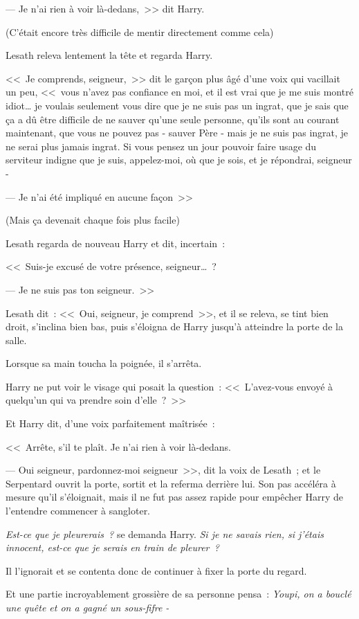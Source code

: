 --- Je n'ai rien à voir là-dedans,~>> dit Harry.

(C'était encore très difficile de mentir directement comme cela)

Lesath releva lentement la tête et regarda Harry.

<<~Je comprends, seigneur,~>> dit le garçon plus âgé d'une voix qui vacillait un peu, <<~vous n'avez pas confiance en moi, et il est vrai que je me suis montré idiot… je voulais seulement vous dire que je ne suis pas un ingrat, que je sais que ça a dû être difficile de ne sauver qu'une seule personne, qu'ils sont au courant maintenant, que vous ne pouvez pas - sauver Père - mais je ne suis pas ingrat, je ne serai plus jamais ingrat. Si vous pensez un jour pouvoir faire usage du serviteur indigne que je suis, appelez-moi, où que je sois, et je répondrai, seigneur -

--- Je n'ai été impliqué en aucune façon~>>

(Mais ça devenait chaque fois plus facile)

Lesath regarda de nouveau Harry et dit, incertain~:

<<~Suis-je excusé de votre présence, seigneur…~?

--- Je ne suis pas ton seigneur.~>>

Lesath dit~: <<~Oui, seigneur, je comprend~>>, et il se releva, se tint bien droit, s'inclina bien bas, puis s'éloigna de Harry jusqu'à atteindre la porte de la salle.

Lorsque sa main toucha la poignée, il s'arrêta.

Harry ne put voir le visage qui posait la question~: <<~L'avez-vous envoyé à quelqu'un qui va prendre soin d'elle~?~>>

Et Harry dit, d'une voix parfaitement maîtrisée~:

<<~Arrête, s'il te plaît. Je n'ai rien à voir là-dedans.

--- Oui seigneur, pardonnez-moi seigneur~>>, dit la voix de Lesath~; et le Serpentard ouvrit la porte, sortit et la referma derrière lui. Son pas accéléra à mesure qu'il s'éloignait, mais il ne fut pas assez rapide pour empêcher Harry de l'entendre commencer à sangloter.

\emph{Est-ce que je pleurerais~?} se demanda Harry. \emph{Si je ne savais rien, si j'étais innocent, est-ce que je serais en train de pleurer~?}

Il l'ignorait et se contenta donc de continuer à fixer la porte du regard.

Et une partie incroyablement grossière de sa personne pensa~: \emph{Youpi, on a bouclé une quête et on a gagné un sous-fifre -}

